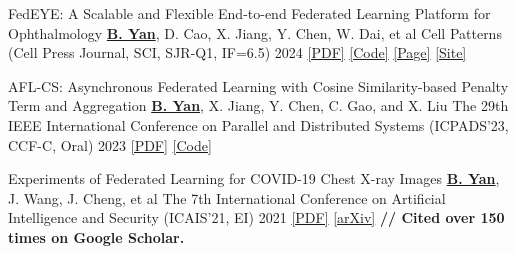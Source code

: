 \begin{cvpublications}
\cvpublication
{FedEYE: A Scalable and Flexible End-to-end Federated Learning Platform for Ophthalmology} %
{\underline{\textbf{B. Yan}}, D. Cao, X. Jiang, Y. Chen, W. Dai, et al} %
{Cell Patterns (Cell Press Journal, SCI, SJR-Q1, IF=6.5)} %
{2024} %
{\href{https://www.cell.com/patterns/fulltext/S2666-3899(24)00019-9}{[PDF]} \href{https://github.com/beiyuouo/FedEYE}{[Code]} \href{https://www.bj-yan.top/FedEYE/}{[Page]} \href{https://fedeye.aierchina.com/}{[Site]}} %


\cvpublication
{AFL-CS: Asynchronous Federated Learning with Cosine Similarity-based Penalty Term and Aggregation} %
{\newline \underline{\textbf{B. Yan}}, X. Jiang, Y. Chen, C. Gao, and X. Liu} %
{The 29th IEEE International Conference on Parallel and Distributed Systems (ICPADS'23, CCF-C, Oral)} %
{2023} %
{\href{https://ieeexplore.ieee.org/document/10476054}{[PDF]} \href{https://github.com/beiyuouo/AFL-CS-ICPADS}{[Code]}} %


\cvpublication
{Experiments of Federated Learning for COVID-19 Chest X-ray Images} %
{\underline{\textbf{B. Yan}}, J. Wang, J. Cheng, et al} %
{The 7th International Conference on Artificial Intelligence and Security (ICAIS'21, EI)} %
{2021} %
{
	\href{https://link.springer.com/chapter/10.1007/978-3-030-78618-2_4}{[PDF]} \href{https://arxiv.org/abs/2007.05592}{[arXiv]}
	\newline \textbf{// Cited over 150 times on Google Scholar.} 
} %







\end{cvpublications}

